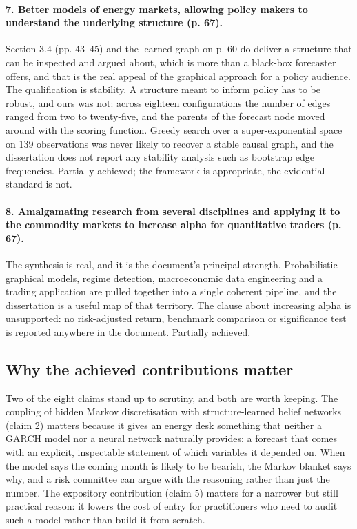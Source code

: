 \documentclass[11pt,a4paper]{article}
\begin{document}
\paragraph{7. Better models of energy markets, allowing policy makers to understand the underlying
structure (p. 67).} Section 3.4 (pp. 43--45) and the learned graph on p. 60 do deliver a structure
that can be inspected and argued about, which is more than a black-box forecaster offers, and
that is the real appeal of the graphical approach for a policy audience. The qualification is
stability. A structure meant to inform policy has to be robust, and ours was not: across eighteen
configurations the number of edges ranged from two to twenty-five, and the parents of the forecast
node moved around with the scoring function. Greedy search over a super-exponential space on 139
observations was never likely to recover a stable causal graph, and the dissertation does not
report any stability analysis such as bootstrap edge frequencies. Partially achieved; the
framework is appropriate, the evidential standard is not.

\paragraph{8. Amalgamating research from several disciplines and applying it to the commodity
markets to increase alpha for quantitative traders (p. 67).} The synthesis is real, and it is the
document's principal strength. Probabilistic graphical models, regime detection, macroeconomic
data engineering and a trading application are pulled together into a single coherent pipeline,
and the dissertation is a useful map of that territory. The clause about increasing alpha is
unsupported: no risk-adjusted return, benchmark comparison or significance test is reported
anywhere in the document. Partially achieved.

\subsection{Why the achieved contributions matter}

Two of the eight claims stand up to scrutiny, and both are worth keeping. The coupling of hidden
Markov discretisation with structure-learned belief networks (claim 2) matters because it gives
an energy desk something that neither a GARCH model nor a neural network naturally provides: a
forecast that comes with an explicit, inspectable statement of which variables it depended on.
When the model says the coming month is likely to be bearish, the Markov blanket says why, and a
risk committee can argue with the reasoning rather than just the number. The expository
contribution (claim 5) matters for a narrower but still practical reason: it lowers the cost of
entry for practitioners who need to audit such a model rather than build it from scratch.
\end{document}

